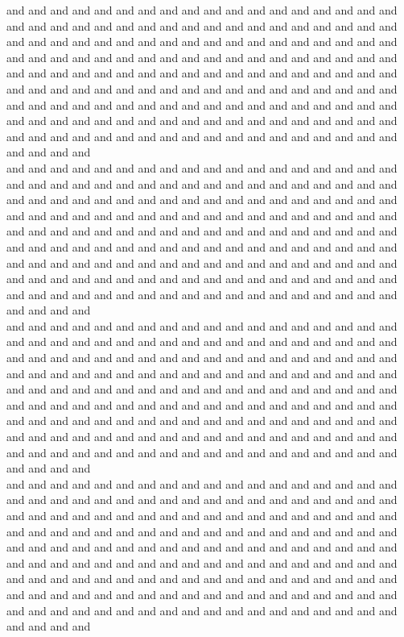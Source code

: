 and and and and and and and and and and and and and and and and and and and and and and and and and and and and and and and and and and and and and and and and and and and and and and and and and and and and and and and and and and and and and and and and and and and and and and and and and and and and and and and and and and and and and and and and and and and and and and and and and and and and and and and and and and and and and and and and and and and and and and and and and and and and and and and and and and and and and and and and and and and and and and and and and and and and and and and and and and and and and and and and and and and and and and\\
and and and and and and and and and and and and and and and and and and and and and and and and and and and and and and and and and and and and and and and and and and and and and and and and and and and and and and and and and and and and and and and and and and and and and and and and and and and and and and and and and and and and and and and and and and and and and and and and and and and and and and and and and and and and and and and and and and and and and and and and and and and and and and and and and and and and and and and and and and and and and and and and and and and and and and and and and and and and and and and and and and and and and and\\
and and and and and and and and and and and and and and and and and and and and and and and and and and and and and and and and and and and and and and and and and and and and and and and and and and and and and and and and and and and and and and and and and and and and and and and and and and and and and and and and and and and and and and and and and and and and and and and and and and and and and and and and and and and and and and and and and and and and and and and and and and and and and and and and and and and and and and and and and and and and and and and and and and and and and and and and and and and and and and and and and and and and and and\\
and and and and and and and and and and and and and and and and and and and and and and and and and and and and and and and and and and and and and and and and and and and and and and and and and and and and and and and and and and and and and and and and and and and and and and and and and and and and and and and and and and and and and and and and and and and and and and and and and and and and and and and and and and and and and and and and and and and and and and and and and and and and and and and and and and and and and and and and and and and and and and and and and and and and and and and and and and and and and and and and and and and and and and\\
